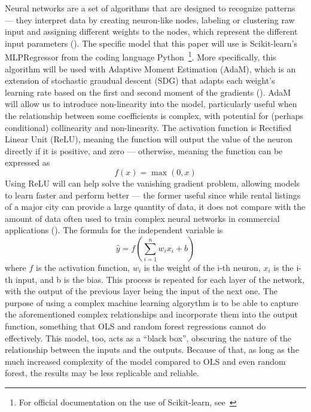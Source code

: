 \documentclass[12pt]{report}
\begin{document}
Neural networks are a set of algorithms that are designed to recognize patterns --- they interpret data by creating neuron-like nodes, labeling or clustering raw input and assigning different weights to the nodes, which represent the different input parameters (\cite{Schmidhuber2015}). The specific model that this paper will use is Scikit-learn’s MLPRegressor from the coding language Python~\footnote{For official documentation on the use of Scikit-learn, see~\cite{scikit-learn}}. More specifically, this algorithm will be used with Adaptive Moment Estimation (AdaM), which is an extension of stochastic graudual descent (SDG) that adapts each weight's learning rate based on the first and second moment of the gradients (\cite{kingma2017adam}). AdaM will allow us to introduce non-linearity into the model, particularly useful when the relationship between some coefficients is complex, with potential for (perhaps conditional) collinearity and non-linearity. The activation function is Rectified Linear Unit (ReLU), meaning the function will output the value of the neuron directly if it is positive, and zero --- otherwise, meaning the function can be expressed as
\begin{equation}
	f(x) = \max(0, x)
\end{equation}
Using ReLU will can help solve the vanishing gradient problem, allowing models to learn faster and perform better --- the former useful since while rental listings of a major city can provide a large quantity of data, it does not compare with the amount of data often used to train complex neural networks in commercial applications (\cite{agarap2019deep}). The formula for the independent variable is
\begin{equation}
	\hat{y} = f(\sum_{i=1}^{n}w_{i}x_{i} + b)
\end{equation}
where $f$ is the activation function, $w_i$ is the weight of the i-th neuron, $x_i$ is the i-th input, and b is the bias. This process is repeated for each layer of the network, with the output of the previous layer being the input of the next one. The purpose of using a complex machine learning algorythm is to be able to capture the aforementioned complex relationships and incorporate them into the output function, something that OLS and random forest regressions cannot do effectively. This model, too, acts as a ``black box'', obscuring the nature of the relationship between the inputs and the outputs. Because of that, as long as the much increased complexity of the model compared to OLS and even random forest, the results may be less replicable and reliable.
\end{document}
